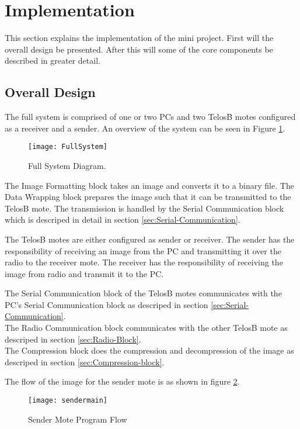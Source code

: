 \section{Implementation}
This section explains the implementation of the mini project. First will the overall design be presented. After this will some of the core components be described in greater detail. 
\subsection{Overall Design}
The full system is comprised of one or two PCs and two TelosB motes configured as a receiver and a sender. An overview of the system can be seen in Figure \ref{FullSystem}.

\begin{figure}[H]
	\centering
	\texttt{[image: FullSystem]}
	\caption{Full System Diagram.}
	\label{FullSystem}
\end{figure}

The Image Formatting block takes an image and converts it to a binary file.
The Data Wrapping block prepares the image such that it can be transmitted to the TelosB mote.
The transmission is handled by the Serial Communication block which is descriped in detail in section \ref{sec:Serial-Communication}.

The TelosB motes are either configured as sender or receiver.  The sender has the responsibility of receiving an image from the PC and transmitting it over the radio to the receiver mote. The receiver has the responsibility of receiving the image from radio and transmit it to the PC.

The Serial Communication block of the TelosB motes communicates with the PC's Serial Communication block as descriped in section \ref{sec:Serial-Communication}.\\
The Radio Communication block communicates with the other TelosB mote as descriped in section \ref{sec:Radio-Block}. \\
The Compression block does the compression and decompression of the image as descriped in section \ref{sec:Compression-block}.

The flow of the image for the sender mote is as shown in figure \ref{fig:sendermain}.

\begin{figure}[H]
	\centering
	\texttt{[image: sendermain]}
	\caption{Sender Mote Program Flow}
	\label{fig:sendermain}
\end{figure}

